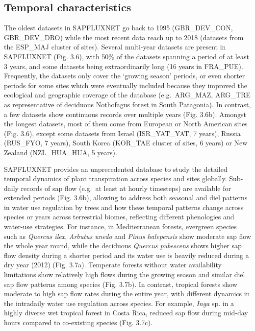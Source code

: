 \documentclass[11pt,twoside]{reedthesis}
\begin{document}
\subsection{Temporal characteristics}\label{temporal-characteristics}

The oldest datasets in SAPFLUXNET go back to 1995 (GBR\_DEV\_CON,
GBR\_DEV\_DRO) while the most recent data reach up to 2018 (datasets
from the ESP\_MAJ cluster of sites). Several multi-year datasets are
present in SAPFLUXNET (Fig. 3.6), with 50\% of the datasets spanning a
period of at least 3 years, and some datasets being extraordinarily long
(16 years in FRA\_PUE). Frequently, the datasets only cover the `growing
season' periods, or even shorter periods for some sites which were
eventually included because they improved the ecological and geographic
coverage of the database (e.g.~ARG\_MAZ, ARG\_TRE as representative of
deciduous Nothofagus forest in South Patagonia). In contrast, a few
datasets show continuous records over multiple years (Fig. 3.6b).
Amongst the longest datasets, most of them come from European or North
American sites (Fig. 3.6), except some datasets from Israel
(ISR\_YAT\_YAT, 7 years), Russia (RUS\_FYO, 7 years), South Korea
(KOR\_TAE cluster of sites, 6 years) or New Zealand (NZL\_HUA\_HUA, 5
years).\par 

SAPFLUXNET provides an unprecedented database to study the detailed
temporal dynamics of plant transpiration across species and sites
globally. Sub-daily records of sap flow (e.g.~at least at hourly
timesteps) are available for extended periods (Fig. 3.6b), allowing to
address both seasonal and diel patterns in water use regulation by trees
and how these temporal patterns change across species or years across
terrestrial biomes, reflecting different phenologies and water-use
strategies. For instance, in Mediterranean forests, evergreen species
such as \emph{Quercus ilex}, \emph{Arbutus unedo} and \emph{Pinus
halepensis} show moderate sap flow the whole year round, while the
deciduous \emph{Quercus pubescens} shows higher sap flow density during
a shorter period and its water use is heavily reduced during a dry year
(2012) (Fig. 3.7a). Temperate forests without water availability
limitations show relatively high flows during the growing season and
similar diel sap flow patterns among species (Fig. 3.7b). In contrast,
tropical forests show moderate to high sap flow rates during the entire
year, with different dynamics in the intradaily water use regulation
across species. For example, \emph{Inga} sp. in a highly diverse wet
tropical forest in Costa Rica, reduced sap flow during mid-day hours
compared to co-existing species (Fig. 3.7c).\par
\end{document}
